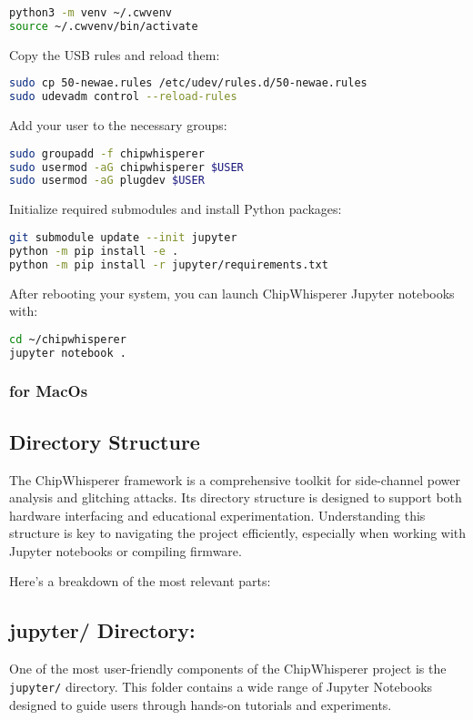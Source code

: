 \begin{lstlisting}[language=bash]
python3 -m venv ~/.cwvenv
source ~/.cwvenv/bin/activate
\end{lstlisting}

Copy the USB rules and reload them:

\begin{lstlisting}[language=bash]
sudo cp 50-newae.rules /etc/udev/rules.d/50-newae.rules
sudo udevadm control --reload-rules
\end{lstlisting}

Add your user to the necessary groups:

\begin{lstlisting}[language=bash]
sudo groupadd -f chipwhisperer
sudo usermod -aG chipwhisperer $USER
sudo usermod -aG plugdev $USER
\end{lstlisting}

Initialize required submodules and install Python packages:

\begin{lstlisting}[language=bash]
git submodule update --init jupyter
python -m pip install -e .
python -m pip install -r jupyter/requirements.txt
\end{lstlisting}

After rebooting your system, you can launch ChipWhisperer Jupyter notebooks with:

\begin{lstlisting}[language=bash]
cd ~/chipwhisperer
jupyter notebook .
\end{lstlisting}

\subsubsection{for MacOs}

\subsection{Directory Structure}
The ChipWhisperer framework is a comprehensive toolkit for side-channel power analysis and glitching attacks. Its directory structure is designed to support both hardware interfacing and educational experimentation. Understanding this structure is key to navigating the project efficiently, especially when working with Jupyter notebooks or compiling firmware.

Here’s a breakdown of the most relevant parts:

\subsection*{jupyter/ Directory:}
One of the most user-friendly components of the ChipWhisperer project is the \texttt{jupyter/} directory. This folder contains a wide range of Jupyter Notebooks designed to guide users through hands-on tutorials and experiments.

